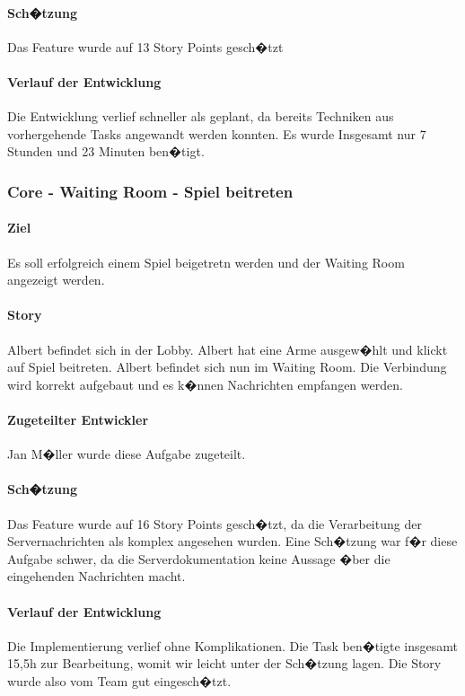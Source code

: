 \documentclass[12pt, titlepage]{scrartcl}
\begin{document}
		\paragraph{Sch�tzung}
		Das Feature wurde auf 13 Story Points gesch�tzt
		\paragraph{Verlauf der Entwicklung} 
		Die Entwicklung verlief schneller als geplant, da bereits Techniken aus vorhergehende Tasks angewandt werden konnten. Es wurde Insgesamt nur 7 Stunden und 23 Minuten ben�tigt.
		
		\subsubsection{Core - Waiting Room - Spiel beitreten}
		\paragraph{Ziel} Es soll erfolgreich einem Spiel beigetretn werden und der Waiting Room angezeigt werden.
		\paragraph{Story} Albert befindet sich in der Lobby. Albert hat eine Arme ausgew�hlt und klickt auf \glqq Spiel beitreten\grqq. Albert befindet sich nun im Waiting Room. Die Verbindung wird korrekt aufgebaut und es k�nnen Nachrichten empfangen werden.
		\paragraph{Zugeteilter Entwickler} Jan M�ller wurde diese Aufgabe zugeteilt.
		\paragraph{Sch�tzung}
		Das Feature wurde auf 16 Story Points gesch�tzt, da die Verarbeitung der Servernachrichten als komplex angesehen wurden. Eine Sch�tzung war f�r diese Aufgabe schwer, da die Serverdokumentation keine Aussage �ber die eingehenden Nachrichten macht.
		\paragraph{Verlauf der Entwicklung} 
		Die Implementierung verlief ohne Komplikationen. Die Task ben�tigte insgesamt 15,5h zur Bearbeitung, womit wir leicht unter der Sch�tzung lagen. Die Story wurde also vom Team gut eingesch�tzt.
		
\end{document}
